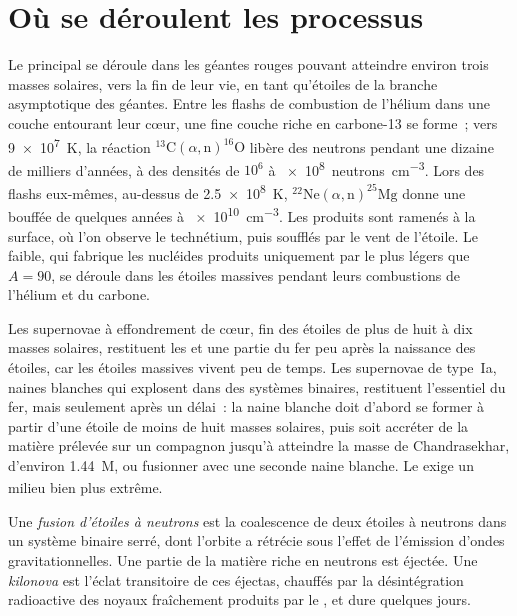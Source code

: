 \section{Où se déroulent les processus}\label{sec:b3:origin-of-elements:sites}

Le  principal se déroule dans les géantes rouges pouvant atteindre environ trois masses solaires, vers
la fin de leur vie, en tant qu'étoiles de la branche asymptotique des géantes. Entre les flashs
de combustion de l'hélium dans une couche entourant leur cœur, une fine couche riche en
carbone-13 se forme~; vers \qty{9e7}{K}, la réaction
$^{13}\mathrm{C}(\alpha,\mathrm{n})^{16}\mathrm{O}$ libère des neutrons
pendant une dizaine de milliers d'années, à des densités de $10^6$ à
\qty{e8}{neutrons.cm^{-3}}. Lors des flashs eux-mêmes, au-dessus de
\qty{2.5e8}{K}, $^{22}\mathrm{Ne}(\alpha,\mathrm{n})^{25}\mathrm{Mg}$
donne une bouffée de quelques années à \qty{e10}{cm^{-3}}. Les produits
sont ramenés à la surface, où l'on observe le technétium, puis
soufflés par le vent de l'étoile. Le  faible, qui fabrique les
nucléides produits uniquement par le  plus légers que $A = 90$, se déroule dans les étoiles massives pendant leurs combustions de l'hélium et
du carbone.

Les supernovae à effondrement de cœur, fin des étoiles de plus de huit à dix
masses solaires, restituent les  et une partie du fer peu après la
naissance des étoiles, car les étoiles massives vivent peu de temps. Les supernovae de type~Ia,
naines blanches qui explosent dans des systèmes binaires, restituent l'essentiel du
fer, mais seulement après un délai~: la naine blanche doit d'abord se former à partir d'une
étoile de moins de huit masses solaires, puis soit accréter de la matière prélevée sur un
compagnon jusqu'à atteindre la masse de Chandrasekhar, d'environ
\qty{1.44}{M_\odot}, ou fusionner avec une seconde naine blanche. Le  exige un milieu bien plus
extrême.

\begin{definition}\label{def:b3:origin-of-elements:kilonova}
Une \emph{fusion d'étoiles à neutrons} est la
coalescence de deux étoiles à neutrons dans un système binaire serré, dont l'orbite a
rétrécie sous l'effet de l'émission d'ondes gravitationnelles. Une partie de la matière riche en
neutrons est éjectée. Une \emph{kilonova} est l'éclat transitoire
de ces éjectas, chauffés par la désintégration radioactive des noyaux
fraîchement produits par le , et dure quelques jours.
\end{definition}

